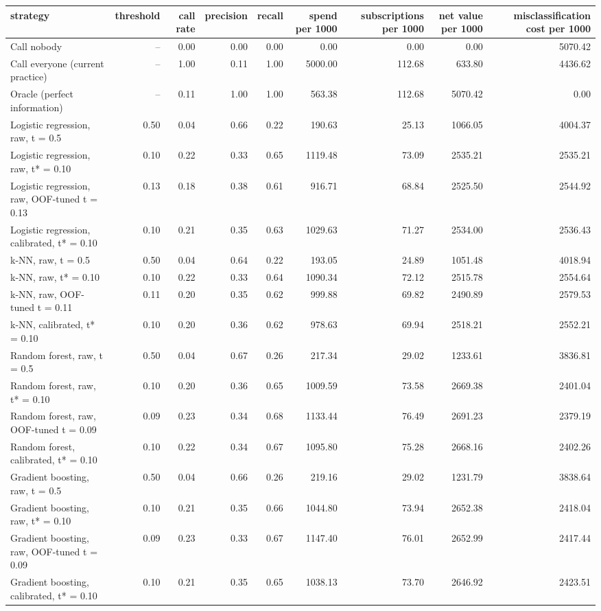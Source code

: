 \begin{tabular}{lrrrrrrrr}
\toprule
strategy & threshold & call rate & precision & recall & spend per 1000 & subscriptions per 1000 & net value per 1000 & misclassification cost per 1000 \\
\midrule
Call nobody & -- & 0.00 & 0.00 & 0.00 & 0.00 & 0.00 & 0.00 & 5070.42 \\
Call everyone (current practice) & -- & 1.00 & 0.11 & 1.00 & 5000.00 & 112.68 & 633.80 & 4436.62 \\
Oracle (perfect information) & -- & 0.11 & 1.00 & 1.00 & 563.38 & 112.68 & 5070.42 & 0.00 \\
Logistic regression, raw, t = 0.5 & 0.50 & 0.04 & 0.66 & 0.22 & 190.63 & 25.13 & 1066.05 & 4004.37 \\
Logistic regression, raw, t* = 0.10 & 0.10 & 0.22 & 0.33 & 0.65 & 1119.48 & 73.09 & 2535.21 & 2535.21 \\
Logistic regression, raw, OOF-tuned t = 0.13 & 0.13 & 0.18 & 0.38 & 0.61 & 916.71 & 68.84 & 2525.50 & 2544.92 \\
Logistic regression, calibrated, t* = 0.10 & 0.10 & 0.21 & 0.35 & 0.63 & 1029.63 & 71.27 & 2534.00 & 2536.43 \\
k-NN, raw, t = 0.5 & 0.50 & 0.04 & 0.64 & 0.22 & 193.05 & 24.89 & 1051.48 & 4018.94 \\
k-NN, raw, t* = 0.10 & 0.10 & 0.22 & 0.33 & 0.64 & 1090.34 & 72.12 & 2515.78 & 2554.64 \\
k-NN, raw, OOF-tuned t = 0.11 & 0.11 & 0.20 & 0.35 & 0.62 & 999.88 & 69.82 & 2490.89 & 2579.53 \\
k-NN, calibrated, t* = 0.10 & 0.10 & 0.20 & 0.36 & 0.62 & 978.63 & 69.94 & 2518.21 & 2552.21 \\
Random forest, raw, t = 0.5 & 0.50 & 0.04 & 0.67 & 0.26 & 217.34 & 29.02 & 1233.61 & 3836.81 \\
Random forest, raw, t* = 0.10 & 0.10 & 0.20 & 0.36 & 0.65 & 1009.59 & 73.58 & 2669.38 & 2401.04 \\
Random forest, raw, OOF-tuned t = 0.09 & 0.09 & 0.23 & 0.34 & 0.68 & 1133.44 & 76.49 & 2691.23 & 2379.19 \\
Random forest, calibrated, t* = 0.10 & 0.10 & 0.22 & 0.34 & 0.67 & 1095.80 & 75.28 & 2668.16 & 2402.26 \\
Gradient boosting, raw, t = 0.5 & 0.50 & 0.04 & 0.66 & 0.26 & 219.16 & 29.02 & 1231.79 & 3838.64 \\
Gradient boosting, raw, t* = 0.10 & 0.10 & 0.21 & 0.35 & 0.66 & 1044.80 & 73.94 & 2652.38 & 2418.04 \\
Gradient boosting, raw, OOF-tuned t = 0.09 & 0.09 & 0.23 & 0.33 & 0.67 & 1147.40 & 76.01 & 2652.99 & 2417.44 \\
Gradient boosting, calibrated, t* = 0.10 & 0.10 & 0.21 & 0.35 & 0.65 & 1038.13 & 73.70 & 2646.92 & 2423.51 \\
\bottomrule
\end{tabular}